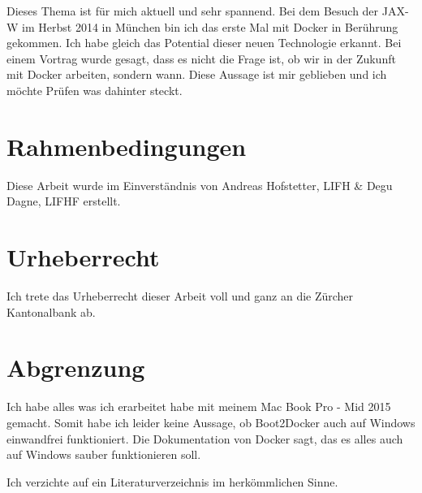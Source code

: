 Dieses Thema ist für mich aktuell und sehr spannend.
Bei dem Besuch der JAX-W im Herbst 2014 in München bin ich das erste Mal mit Docker
in Berührung gekommen. Ich habe gleich das Potential dieser neuen
Technologie erkannt. Bei einem Vortrag wurde gesagt, dass es nicht die
Frage ist, ob wir in der Zukunft mit Docker arbeiten, sondern wann. Diese Aussage
ist mir geblieben und ich möchte Prüfen was dahinter steckt.

\section{Rahmenbedingungen}

Diese Arbeit wurde im Einverständnis von Andreas Hofstetter, LIFH \& Degu Dagne, LIFHF
erstellt.

\section{Urheberrecht}

Ich trete das Urheberrecht dieser Arbeit voll und ganz an die Zürcher Kantonalbank ab.

\section{Abgrenzung}

Ich habe alles was ich erarbeitet habe mit meinem Mac Book Pro - Mid 2015 gemacht.
Somit habe ich leider keine Aussage, ob Boot2Docker auch auf Windows einwandfrei funktioniert.
Die Dokumentation von Docker sagt, das es alles auch auf Windows sauber funktionieren soll.

Ich verzichte auf ein Literaturverzeichnis im herkömmlichen Sinne.